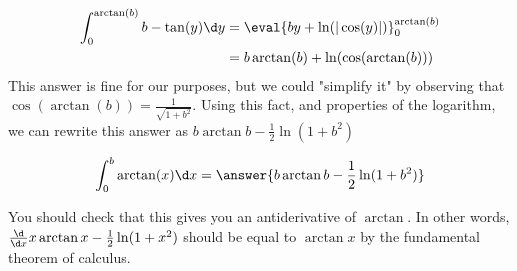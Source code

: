 \documentclass{ximera}
\begin{document}
\begin{exercise}
\begin{hint}
  
  \begin{align*}
    \int_{0}^{\arctan(b)} b - \tan(y) \d y &=  \eval{b y + \ln(|\cos(y)|)}_0^{\arctan(b)}\\
    &= b\arctan(b) + \ln(\cos(\arctan(b)))
  \end{align*}
  This answer is fine for our purposes, but we could "simplify it" by observing that $\cos(\arctan(b)) = \frac{1}{\sqrt{1+b^2}}$.
Using this fact, and properties of the logarithm, we can rewrite this answer as $b\arctan{b}-\frac{1}{2} \ln(1+b^2)$
\end{hint}

\begin{prompt}
	\[
	\int_0^b \arctan(x) \d x = \answer{b\arctan{b}-\frac{1}{2} \ln(1+b^2)}
	\]
	\begin{feedback}
          You should check that this gives you an antiderivative of
          $\arctan$.  In other words, $\frac{\d}{\d x}
          x\arctan{x}-\frac{1}{2} \ln(1+x^2)$ should be equal to
          $\arctan{x}$ by the fundamental theorem of calculus.
        \end{feedback}
\end{prompt}

\end{exercise}
\end{document}
